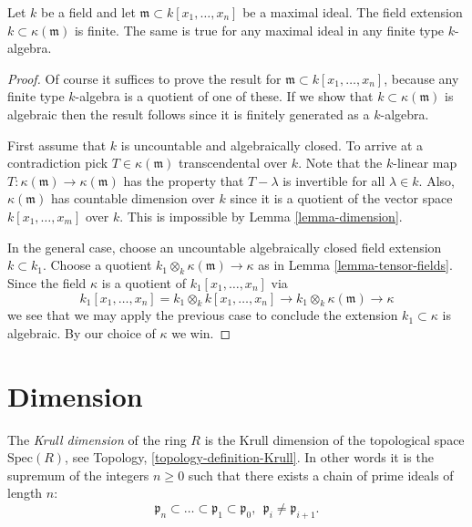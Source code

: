 \begin{theorem}
\label{theorem-nulstellensatz}
Let $k$ be a field and let $\mathfrak m \subset 
k[x_1,\ldots,x_n]$ be a maximal ideal.
The field extension $k \subset \kappa(\mathfrak m)$
is finite. The same is true for any maximal ideal in
any finite type $k$-algebra.
\end{theorem}

\begin{proof}
Of course it suffices to prove the result for $\mathfrak m \subset 
k[x_1,\ldots,x_n]$, because any finite type $k$-algebra is a
quotient of one of these. 
If we show that $k \subset \kappa(\mathfrak m)$
is algebraic then the result follows since it is
finitely generated as a $k$-algebra.

\medskip\noindent
First assume that $k$ is uncountable and algebraically closed.
To arrive at a contradiction pick
$T \in \kappa(\mathfrak m)$ transcendental over $k$.
Note that the $k$-linear map $T : \kappa(\mathfrak m)
\to \kappa(\mathfrak m)$ has the property that
$T - \lambda$ is invertible for all $\lambda \in k$.
Also, $\kappa(\mathfrak m)$ has countable dimension
over $k$ since it is a quotient of the vector space
$k[x_1,\ldots,x_m]$ over $k$.
This is impossible by Lemma \ref{lemma-dimension}.

\medskip\noindent
In the general case, choose an uncountable algebraically closed
field extension $k \subset k_1$. Choose a quotient
$k_1\otimes_k \kappa(\mathfrak m) \to \kappa$ as in
Lemma \ref{lemma-tensor-fields}. Since the field
$\kappa$ is a quotient of $k_1[x_1,\ldots,x_n]$ via
$$
k_1[x_1,\ldots,x_n]
=
k_1 \otimes_k k[x_1,\ldots,x_n]
\to 
k_1\otimes_k \kappa(\mathfrak m)
\to
\kappa
$$
we see that we may apply the previous case to conclude the
extension $k_1 \subset \kappa$ is algebraic. By our choice
of $\kappa$ we win.
\end{proof}

\section{Dimension}
\label{section-dimension}

\begin{definition}
\label{definition-Krull}
The {\it Krull dimension} of the ring $R$ is the 
Krull dimension of the topological space $\text{Spec}(R)$,
see Topology, \ref{topology-definition-Krull}.
In other words it is the supremum of the integers $n\geq 0$
such that there exists a chain of prime ideals of length $n$:
$$
\mathfrak p_n
\subset 
\ldots
\subset
\mathfrak p_1
\subset
\mathfrak p_0,\ \ 
\mathfrak p_i \not= \mathfrak p_{i+1}.
$$
\end{definition}


